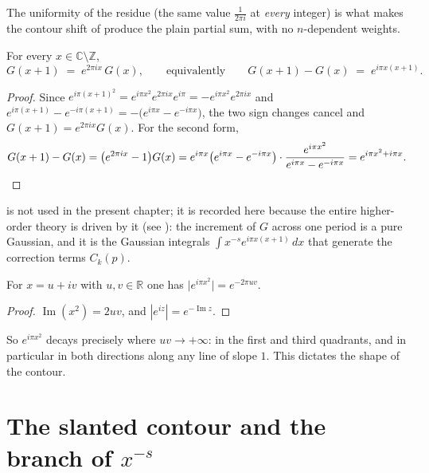 The uniformity of the residue (the same value $\tfrac1{2\pi i}$ at \emph{every} integer)
is what makes the contour shift of  produce the plain partial sum,
with no $n$-dependent weights.

\begin{lemma}
\label{lem:rs_kernel_quasi}
\leanok
{}
For every $x\in\mathbb{C}\setminus\mathbb{Z}$,
\[
  G(x+1)\;=\;e^{2\pi i x}\,G(x),\qquad\text{equivalently}\qquad
  G(x+1)-G(x)\;=\;e^{i\pi x(x+1)} .
\]
\end{lemma}

\begin{proof}
\leanok
Since $e^{i\pi(x+1)^{2}}=e^{i\pi x^{2}}e^{2\pi ix}e^{i\pi}=-e^{i\pi x^{2}}e^{2\pi ix}$ and
$e^{i\pi(x+1)}-e^{-i\pi(x+1)}=-\bigl(e^{i\pi x}-e^{-i\pi x}\bigr)$, the two sign changes
cancel and $G(x+1)=e^{2\pi ix}G(x)$.  For the second form,
\[
  G(x+1)-G(x)=\bigl(e^{2\pi ix}-1\bigr)G(x)
  =e^{i\pi x}\bigl(e^{i\pi x}-e^{-i\pi x}\bigr)\cdot\frac{e^{i\pi x^{2}}}{e^{i\pi x}-e^{-i\pi x}}
  =e^{i\pi x^{2}+i\pi x}. \qedhere
\]
\end{proof}

 is not used in the present chapter; it is recorded here
because the entire higher-order theory is driven by it (see ): the
increment of $G$ across one period is a pure Gaussian, and it is the Gaussian integrals
$\int x^{-s}e^{i\pi x(x+1)}\,dx$ that generate the correction terms $C_k(p)$.

\begin{lemma}
\label{lem:rs_gauss_modulus}
\leanok
For $x=u+iv$ with $u,v\in\mathbb{R}$ one has $\bigl|e^{i\pi x^{2}}\bigr|=e^{-2\pi uv}$.
\end{lemma}

\begin{proof}
\leanok
$\operatorname{Im}(x^{2})=2uv$, and $|e^{iz}|=e^{-\operatorname{Im}z}$.
\end{proof}

So $e^{i\pi x^{2}}$ decays precisely where $uv\to+\infty$: in the first and third
quadrants, and in particular in both directions along any line of slope $1$.  This
dictates the shape of the contour.

\section{The slanted contour and the branch of \texorpdfstring{$x^{-s}$}{x\^{}-s}}
\label{sec:rs_contour}

